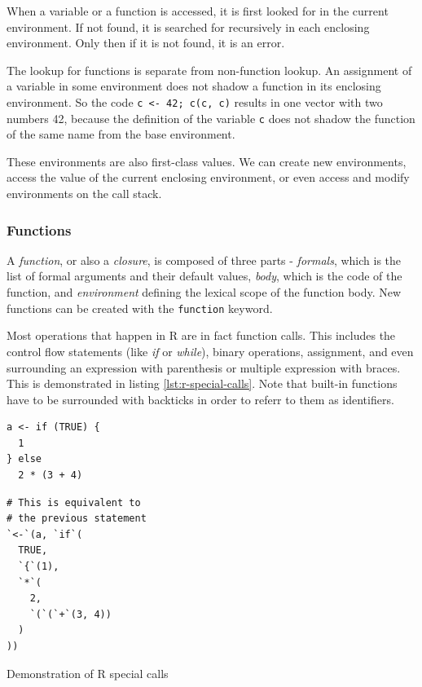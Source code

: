 When a variable or a function is accessed, it is first looked for in the current environment. If not found, it is searched for recursively in each enclosing environment. Only then if it is not found, it is an error.

The lookup for functions is separate from non-function lookup. An assignment of a variable in some environment does not shadow a function in its enclosing environment. So the code \texttt{c <- 42; c(c, c)} results in one vector with two numbers 42, because the definition of the variable \texttt{c} does not shadow the function of the same name from the base environment.

These environments are also first-class values. We can create new environments, access the value of the current enclosing environment, or even access and modify environments on the call stack.

\subsubsection*{Functions}

A \textit{function}, or also a \textit{closure}, is composed of three parts - \textit{formals}, which is the list of formal arguments and their default values, \textit{body}, which is the code of the function, and \textit{environment} defining the lexical scope of the function body. New functions can be created with the \texttt{function} keyword.

Most operations that happen in R are in fact function calls. This includes the control flow statements (like \textit{if} or \textit{while}), binary operations, assignment, and even surrounding an expression with parenthesis or multiple expression with braces. This is demonstrated in listing \ref{lst:r-special-calls}. Note that built-in functions have to be surrounded with backticks in order to referr to them as identifiers.

\begin{listing}[t]
	\begin{sublisting}[t!]{0.47\textwidth}
		\centering
		\begin{verbatim}
a <- if (TRUE) {
  1
} else
  2 * (3 + 4)
    \end{verbatim}
	\end{sublisting}
	\hfill
	\begin{sublisting}[t!]{0.47\textwidth}
		\centering
		\begin{verbatim}
# This is equivalent to
# the previous statement
`<-`(a, `if`(
  TRUE,
  `{`(1),
  `*`(
    2,
    `(`(`+`(3, 4))
  )
))
    \end{verbatim}
	\end{sublisting}
	\caption{Demonstration of R special calls}\label{lst:r-special-calls}
\end{listing}

